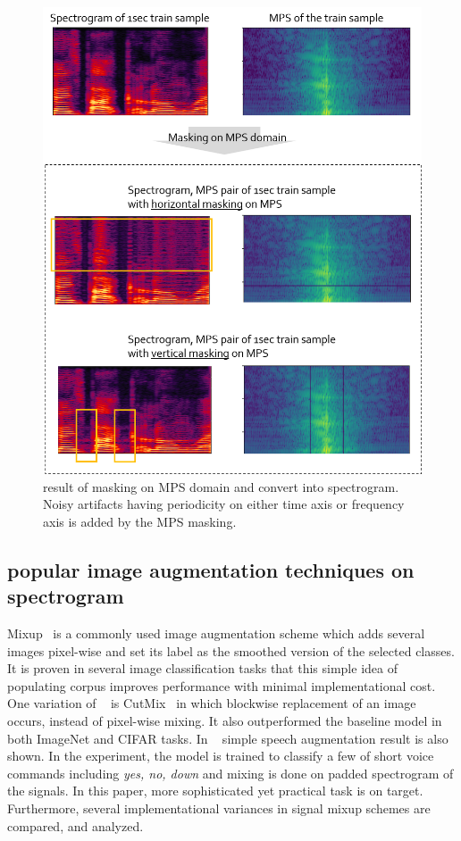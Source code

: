 \documentclass[10pt,twocolumn,letterpaper]{article}
\begin{document}
\begin{figure}[h]
   \centering
   \includegraphics[width=\linewidth]{mps_result}
   \caption{result of masking on MPS domain and convert into spectrogram. Noisy artifacts having 
   periodicity on either time axis or frequency axis is added by the MPS masking.}
   \label{fig:mps_result}
\end{figure}

\subsection{popular image augmentation techniques on spectrogram}
\label{sec:popular}

Mixup~\cite{zhang2017mixup} is a commonly used image augmentation scheme which adds several images 
pixel-wise and set its label as the smoothed version of the selected classes. It is proven in several image 
classification tasks that this simple idea of populating corpus improves performance with minimal 
implementational cost. 
One variation of ~\cite{zhang2017mixup} is CutMix~\cite{yun2019cutmix} in which blockwise replacement of an image
occurs, instead of pixel-wise mixing. It also outperformed the baseline model in both ImageNet and CIFAR tasks.
In ~\cite{zhang2017mixup} simple speech augmentation result is also shown. In the experiment, the model is trained 
to classify a few of short voice commands including \textit{yes, no, down} and mixing is done on 
padded spectrogram of the signals.
In this paper, more sophisticated yet practical task is on target. Furthermore, several implementational variances 
in signal mixup schemes are compared, and analyzed.
\end{document}
